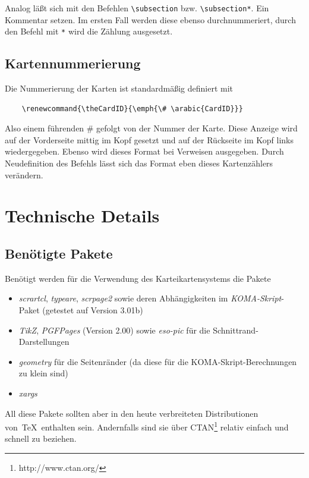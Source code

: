 \documentclass[a4paper,DIV=calc]{scrartcl}
\begin{document}
Analog läßt sich mit den Befehlen \lstinline!\subsection! bzw. \lstinline!\subsection*!. Ein Kommentar setzen. Im ersten Fall werden diese ebenso durchnummeriert, durch den Befehl mit \lstinline!*! wird die Zählung ausgesetzt.

\subsection{Kartennummerierung}
Die Nummerierung der Karten ist standardmäßig definiert mit 
\begin{lstlisting}
	\renewcommand{\theCardID}{\emph{\# \arabic{CardID}}}
\end{lstlisting}
Also einem führenden \# gefolgt von der Nummer der Karte. Diese Anzeige wird auf der Vorderseite mittig im Kopf gesetzt und auf der Rückseite im Kopf links wiedergegeben. Ebenso wird dieses Format bei Verweisen ausgegeben. Durch Neudefinition des Befehls lässt sich das Format eben dieses Kartenzählers verändern.
%
%
%
\section{Technische Details}
\subsection{Benötigte Pakete}
Benötigt werden für die Verwendung des Karteikartensystems die Pakete
\begin{itemize}
	\item \emph{scrartcl}, \emph{typeare}, \emph{scrpage2} sowie deren Abhängigkeiten im \emph{KOMA-Skript}-Paket (getestet auf Version 3.01b)
	\item \emph{TikZ}, \emph{PGFPages} (Version 2.00) sowie \emph{eso-pic} für die Schnittrand-Darstellungen
	\item \emph{geometry} für die Seitenränder (da diese für die KOMA-Skript-Berechnungen zu klein sind)
	\item \emph{xargs}
\end{itemize}
All diese Pakete sollten aber in den heute verbreiteten Distributionen von\ \TeX\ enthalten sein. Andernfalls sind sie über CTAN\footnote{http://www.ctan.org/} relativ einfach und schnell zu beziehen.
\end{document}
